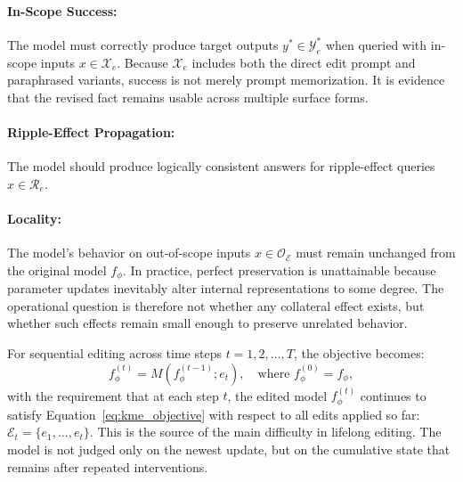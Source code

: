 \paragraph{In-Scope Success:} The model must correctly produce target outputs $y^* \in \mathcal{Y}_e^*$ when queried with in-scope inputs $x \in \mathcal{X}_e$. Because $\mathcal{X}_e$ includes both the direct edit prompt and paraphrased variants, success is not merely prompt memorization. It is evidence that the revised fact remains usable across multiple surface forms.

\paragraph{Ripple-Effect Propagation:} The model should produce logically consistent answers for ripple-effect queries $x \in \mathcal{R}_e$.

\paragraph{Locality:} The model's behavior on out-of-scope inputs $x \in \mathcal{O}_{\mathcal{E}}$ must remain unchanged from the original model $f_\phi$. In practice, perfect preservation is unattainable because parameter updates inevitably alter internal representations to some degree. The operational question is therefore not whether any collateral effect exists, but whether such effects remain small enough to preserve unrelated behavior.

For sequential editing across time steps $t = 1, 2, \ldots, T$, the objective becomes:
\begin{equation}
f_\phi^{(t)} = M(f_\phi^{(t-1)}; e_t), \quad \text{where } f_\phi^{(0)} = f_\phi,
\end{equation}
with the requirement that at each step $t$, the edited model $f_\phi^{(t)}$ continues to satisfy Equation~\ref{eq:kme_objective} with respect to all edits applied so far: $\mathcal{E}_t = \{e_1, \ldots, e_t\}$. This is the source of the main difficulty in lifelong editing. The model is not judged only on the newest update, but on the cumulative state that remains after repeated interventions.
